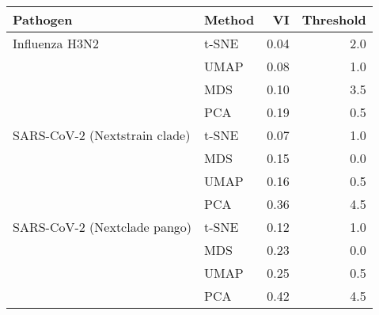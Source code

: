 \begin{tabular}{llrr}
\toprule
                     Pathogen & Method &   VI &  Threshold \\
\midrule
               Influenza H3N2 &  t-SNE & 0.04 &        2.0 \\
                              &   UMAP & 0.08 &        1.0 \\
                              &    MDS & 0.10 &        3.5 \\
                              &    PCA & 0.19 &        0.5 \\
SARS-CoV-2 (Nextstrain clade) &  t-SNE & 0.07 &        1.0 \\
                              &    MDS & 0.15 &        0.0 \\
                              &   UMAP & 0.16 &        0.5 \\
                              &    PCA & 0.36 &        4.5 \\
 SARS-CoV-2 (Nextclade pango) &  t-SNE & 0.12 &        1.0 \\
                              &    MDS & 0.23 &        0.0 \\
                              &   UMAP & 0.25 &        0.5 \\
                              &    PCA & 0.42 &        4.5 \\
\bottomrule
\end{tabular}
